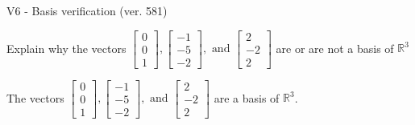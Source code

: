 \begin{exercise}
  \begin{exerciseTitle}V6 - Basis verification (ver. 581)\end{exerciseTitle}
  \begin{exerciseStatement}
    Explain why the vectors \(\left[\begin{array}{r}
0 \\
0 \\
1
\end{array}\right] , \left[\begin{array}{r}
-1 \\
-5 \\
-2
\end{array}\right] , \text{ and } \left[\begin{array}{r}
2 \\
-2 \\
2
\end{array}\right]\) are or are not a basis of \(\mathbb{R}^3\)	


  \end{exerciseStatement}
  \begin{exerciseAnswer}
   The vectors \(\left[\begin{array}{r}
0 \\
0 \\
1
\end{array}\right] , \left[\begin{array}{r}
-1 \\
-5 \\
-2
\end{array}\right] , \text{ and } \left[\begin{array}{r}
2 \\
-2 \\
2
\end{array}\right]\) 
  	 are  a basis of \(\mathbb{R}^3\).
  


  \end{exerciseAnswer}
\end{exercise}